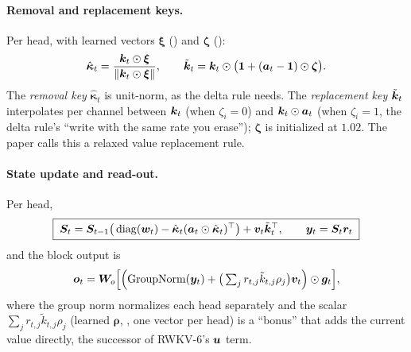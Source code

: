 \paragraph{Removal and replacement keys.} Per head, with learned vectors $\bm\xi$
() and $\bm\zeta$ ():
\begin{equation}\label{eq:c06-rwkv-keys}
  \hat{\bm\kappa}_t=\frac{\bm{k}_t\odot\bm\xi}{\left\lVert \bm{k}_t\odot\bm\xi\right\rVert},\qquad
  \tilde{\bm{k}}_t=\bm{k}_t\odot\big(\bm1+(\bm{a}_t-\bm1)\odot\bm\zeta\big).
\end{equation}
The \emph{removal key} $\hat{\bm\kappa}_t$ is unit-norm, as the delta rule needs. The
\emph{replacement key} $\tilde{\bm{k}}_t$ interpolates per channel between $\bm{k}_t$ (when
$\zeta_i=0$) and $\bm{k}_t\odot\bm{a}_t$ (when $\zeta_i=1$, the delta rule's ``write with the same
rate you erase''); $\bm\zeta$ is initialized at $1.02$. The paper calls this a relaxed value
replacement rule.

\paragraph{State update and read-out.} Per head,
\begin{equation}\label{eq:c06-rwkv7}
  \boxed{\;\bm{S}_t=\bm{S}_{t-1}\big(\operatorname{diag}(\bm{w}_t)-\hat{\bm\kappa}_t(\bm{a}_t\odot\hat{\bm\kappa}_t)^{\top}\big)+\bm{v}_t\tilde{\bm{k}}_t^{\top},
  \qquad \bm{y}_t=\bm{S}_t\bm{r}_t\;}
\end{equation}
and the block output is
\begin{equation}\label{eq:c06-rwkv-out}
  \bm{o}_t=\bm{W}_o\Big[\Big(\mathrm{GroupNorm}(\bm{y}_t)+\big(\textstyle\sum_{j}r_{t,j}\tilde k_{t,j}\rho_j\big)\bm{v}_t\Big)\odot\bm{g}_t\Big],
\end{equation}
where the group norm normalizes each head separately and the scalar
$\sum_jr_{t,j}\tilde k_{t,j}\rho_j$ (learned $\bm\rho$, , one vector per head) is a
``bonus'' that adds the current value directly, the successor of RWKV-6's $\bm{u}$ term.

